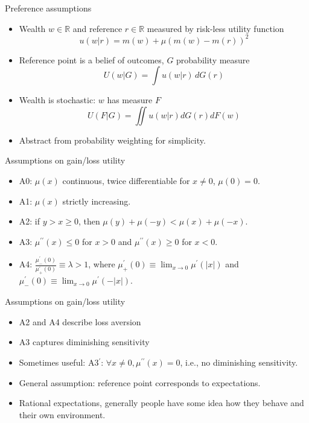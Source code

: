 \documentclass[11pt, aspectratio=169]{beamer}
\begin{document}
\begin{frame}{Preference assumptions}
    \begin{itemize}
        \item Wealth $w \in \mathbb{R}$ and reference $r \in \mathbb{R}$ measured by risk-less utility function
               \[u(w | r) = m(w) + \mu ( m(w) - m(r) )^2\]
                \item Reference point is a belief of outcomes, $G$ probability measure
         \[U(w | G)=\int u(w|r)  \,dG(r)\]
        \item Wealth is stochastic: $w$ has measure $F$
        \[U(F|G)=\iint u(w | r) dG(r) dF(w)\]
        \item Abstract from probability weighting for simplicity.\medskip
	\end{itemize}
\end{frame}


\begin{frame}{Assumptions on gain/loss utility}
    \begin{itemize}
        \item A0: $\mu(x) $ continuous, twice differentiable for $x\neq 0$, $\mu(0)=0 $.\medskip
        \item A1: $ \mu(x)$ strictly increasing. \medskip
        \item A2: if $y>x\geq 0 $, then $\mu(y)+\mu(-y) <\mu(x) +\mu(-x) $.\medskip
    \item A3: $ \mu^{\prime\prime}(x) \leq 0 $ for $ x>0$ and $\mu^{\prime\prime}(x) \geq 0$ for $ x<0 $.\medskip
        \item A4: $\frac{\mu^{'}_{-}(0)}{\mu^{'}_{+}(0)} \equiv \lambda >1 $,
    where $ \mu^{\prime}_{+}(0) \equiv \lim_{x \to 0} \mu^{\prime}(\left\lvert x \right \rvert )$ and $ \mu^{\prime}_{-}(0) \equiv \lim_{x \to 0} \mu^{\prime}(-\left\lvert x \right\rvert )$.\medskip
	\end{itemize}
\end{frame}




\begin{frame}{Assumptions on gain/loss utility}
    \begin{itemize}
 	\item A2 and A4 describe loss aversion\medskip
        \item A3 captures diminishing sensitivity\medskip
        \item Sometimes useful: A3$^{\prime}$: $\forall x \neq 0, \mu^{\prime \prime}(x)=0$, i.e., no diminishing sensitivity.\medskip
        \item General assumption: reference point corresponds to expectations.\medskip
        \item Rational expectations, generally people have some idea how they behave and their own environment.\medskip
	\end{itemize}
\end{frame}
\end{document}

